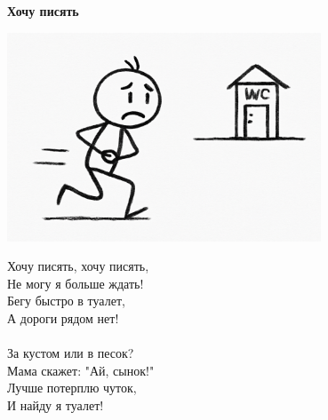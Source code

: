 \vspace*{\fill}
\begin{center}
  {\huge\textbf{Хочу писять}}

  \vspace{1.5em}
  \includegraphics[width=0.7\textwidth]{pictures/pee.png}
  \vspace{4em}
  \parbox{0.6\textwidth}{
    \LARGE
    \begin{spacing}{1.2}
      Хочу писять, хочу писять,\\
      Не могу я больше ждать!\\
      Бегу быстро в туалет,\\
      А дороги рядом нет!\\
      \\
      За кустом или в песок?\\
      Мама скажет: "Ай, сынок!"\\
      Лучше потерплю чуток,\\
      И найду я туалет! %
    \end{spacing}
      
  }
\end{center}
\vspace*{\fill}